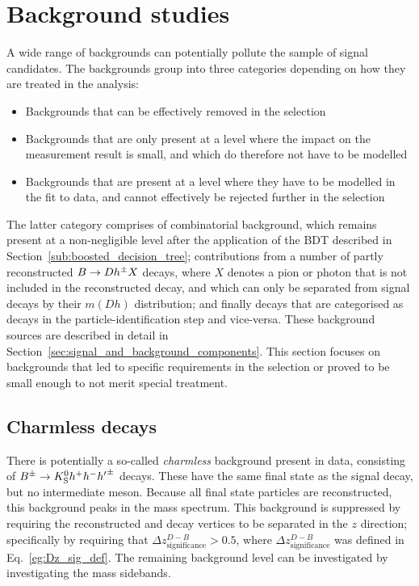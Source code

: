 

\section{Background studies} %
\label{sec:background_studies}

A wide range of backgrounds can potentially pollute the sample of signal candidates. The backgrounds group into three categories depending on how they are treated in the analysis: 
\begin{itemize}
    \item Backgrounds that can be effectively removed in the selection
    \item Backgrounds that are only present at a level where the impact on the measurement result is small, and which do therefore not have to be modelled
    \item Backgrounds that are present at a level where they have to be modelled in the fit to data, and cannot effectively be rejected further in the selection
\end{itemize}
The latter category comprises of combinatorial background, which remains present at a non-negligible level after the application of the BDT described in Section~\ref{sub:boosted_decision_tree};  contributions from a number of partly reconstructed ${B}\rightarrow{\ensuremath{D}} h^\pm X$ decays, where $X$ denotes a pion or photon that is not included in the reconstructed decay, and which can only be separated from signal decays by their $m(Dh)$ distribution; and finally \BtoDpi decays that are categorised as \BtoDK decays in the particle-identification step and vice-versa. These background sources are described in detail in Section~\ref{sec:signal_and_background_components}. This section focuses on backgrounds that led to specific requirements in the selection or proved to be small enough to not merit special treatment.

\subsection{Charmless decays} %
\label{sub:charmless_decays}




There is potentially a so-called \emph{charmless} background present in data, consisting of ${{B}^\pm}\rightarrow{\ensuremath{{K}^0_{\mathrm{S}}}} h^+ h^- {h'}^\pm$ decays. These have the same final state as the signal decay, but no intermediate \D meson. Because all final state particles are reconstructed, this background peaks in the \B mass spectrum.
This background is suppressed by requiring the reconstructed \B and \D decay vertices to be separated in the $z$ direction; specifically by requiring that $\Delta z^{D-B}_{\text{significance}} > 0.5$, where $\Delta z^{D-B}_{\text{significance}}$ was defined in Eq.~\eqref{eg:Dz_sig_def}. The remaining background level can be investigated by investigating the \D mass sidebands. 

